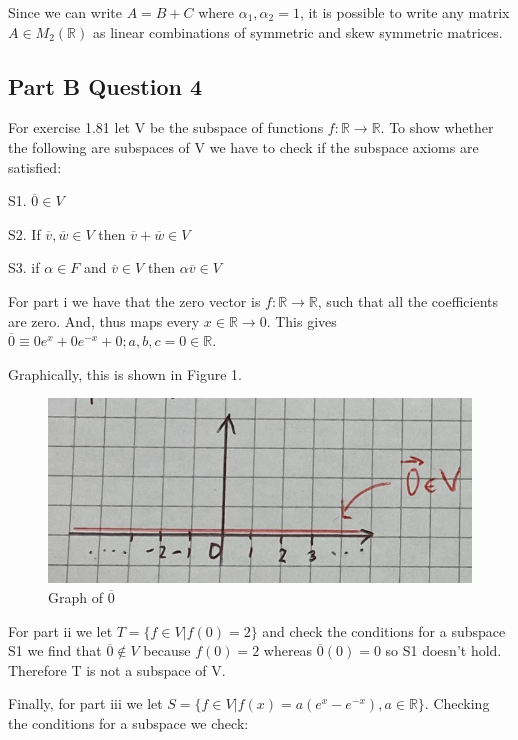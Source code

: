\documentclass{article}
\begin{document}
Since we can write $A = B+C$ where $\alpha_1, \alpha_2 = 1$, it is possible to write any matrix $A \in M_2(\mathbb{R})$ as linear combinations of symmetric and skew symmetric matrices.


\subsection{Part B Question 4}
For exercise 1.81 let V be the subspace of functions $f: \mathbb{R} \rightarrow \mathbb{R}$. To show whether the following are subspaces of V we have to check if the subspace axioms are satisfied:

S1. $\overline{0} \in V$

S2. If $\overline{v}, \overline{w} \in V$ then $\overline{v} + \overline{w} \in V$

S3. if $\alpha \in F$ and $\overline {v} \in V$ then $\alpha \overline{v} \in V$

For part i we have that the zero vector is $f: \mathbb{R} \rightarrow \mathbb{R}$, such that all the coefficients are zero. And, thus maps every $x \in \mathbb{R} \rightarrow 0$. This gives $\overline{0} \equiv 0 e^x + 0e^{-x} + 0 ; a,b,c = 0 \in \mathbb{R}$. 

Graphically, this is shown in Figure 1.

\begin{figure}[ht]
    \centering
    \includegraphics[scale = 0.6]{Figure.png}
    \caption{Graph of $\overline{0}$}
    \label{fig:enter-label}
\end{figure}

For part ii we let $T = \{ f\in V | f(0) = 2 \}$ and check the conditions for a subspace S1 we find that $\overline{0} \notin V$ because $f(0) = 2$ whereas $\overline{0}(0) = 0$ so S1 doesn't hold. Therefore T is not a subspace of V.

Finally, for part iii we let $S = \{ f \in V | f(x) = a(e^x - e^{-x}), a \in \mathbb{R} \} $. Checking the conditions for a subspace we check:
\end{document}
